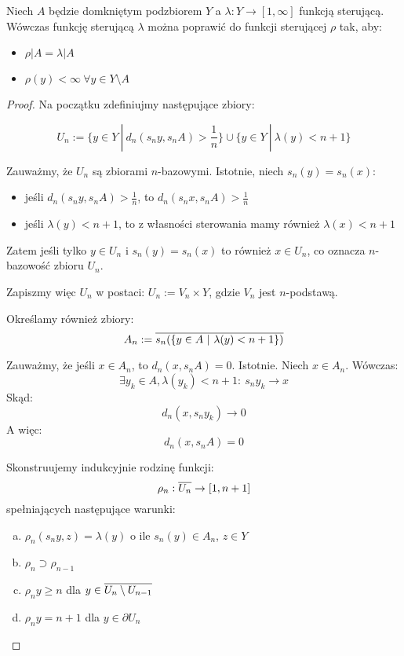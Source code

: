 \begin{thm}
\label{thm:steering-function}
Niech $A$ będzie domkniętym podzbiorem $Y$ a $\lambda: Y \rightarrow [1,\infty]$ funkcją sterującą. Wówczas funkcję sterującą $\lambda$ można poprawić do funkcji sterującej $\rho$ tak, aby:
\begin{itemize}
  \item $\rho|A = \lambda|A$
  \item $\rho(y) < \infty\ \forall y \in Y \setminus A$
\end{itemize}

\begin{proof}
  
  Na początku zdefiniujmy następujące zbiory:
  
  $$U_n := \{y \in Y\ |\ d_n(s_n y, s_n A) > \frac{1}{n}\} \cup \{y \in Y\ |\ \lambda(y) < n+1\}$$
  
  Zauważmy, że $U_n$ są zbiorami $n$-bazowymi. Istotnie, niech $s_n(y) = s_n(x)$:
  \begin{itemize}
    \item jeśli $d_n(s_n y, s_n A) > \frac{1}{n}$, to $d_n(s_n x, s_n A) > \frac{1}{n}$
    \item jeśli $\lambda(y) < n+1$, to z własności sterowania mamy również $\lambda(x) < n+1$
  \end{itemize}
  Zatem jeśli tylko $y \in U_n$ i $s_n(y) = s_n(x)$ to również $x \in U_n$, co oznacza $n$-bazowość zbioru $U_n$.
  
  Zapiszmy więc $U_n$ w postaci: $U_n := V_n \times Y$, gdzie $V_n$ jest $n$-podstawą.
  
  Określamy również zbiory:
  $$A_n := \overline{s_n({\{y \in A\ |\ \lambda(y) < n+1\}})}$$
  
  Zauważmy, że jeśli $x \in A_n$, to $d_n(x, s_n A) = 0$. Istotnie. Niech $x \in A_n$. Wówczas:
  $$\exists y_k \in A, \lambda(y_k) < n+1:\ s_n y_k \rightarrow x$$
  Skąd:
  $$d_n(x, s_n y_k) \rightarrow 0$$
  A więc:
  $$d_n(x, s_n A) = 0$$
  
  Skonstruujemy indukcyjnie rodzinę funkcji:
  $$\rho_n: \overline{U_n} \rightarrow [1, n+1]$$
  spełniających następujące warunki:
  \begin{enumerate}[(a)]
    \item \label{induction-1} $\rho_n(s_n y, z) = \lambda(y)$ o ile $s_n(y) \in A_n$, $z \in Y$
    \item \label{induction-2} $\rho_n \supset \rho_{n-1}$
    \item \label{induction-3} $\rho_n y \geq n$ dla $y \in \overline{U_n \setminus U_{n-1}}$
    \item \label{induction-4} $\rho_n y = n+1$ dla $y \in \partial U_n$
  \end{enumerate}
  

\end{proof}
\end{thm}
